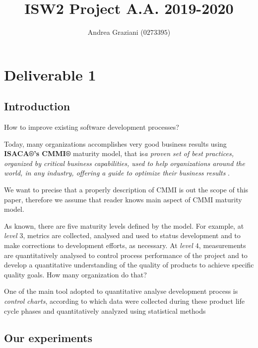 \documentclass[sigconf]{acmart}
\begin{document}
\title{ISW2 Project A.A. 2019-2020}

\author{Andrea Graziani ($0273395$)}

\maketitle
\section{Deliverable 1}

\subsection{Introduction}

How to improve existing software development processes?

Today, many organizations accomplishes very good business results using \textbf{ISACA®’s CMMI®} maturity model, that is\textit{a proven set of best practices, organized by critical business capabilities, used to help organizations around the world, in any industry, offering a guide to optimize their business results} \cite{CMMIINSTITUTE}.

We want to precise that a properly description of CMMI is out the scope of this paper, therefore we assume that reader knows main aspect of CMMI maturity model.

As known, there are five maturity levels defined by the model. For example, at \textit{level $3$}, metrics are collected, analysed and used to status development and to make corrections to development efforts, as necessary. At \textit{level $4$}, measurements are quantitatively analysed to control process performance of the project and to develop a quantitative understanding of the quality of products to achieve specific quality goals. How many organization do that?

One of the main tool adopted to quantitative analyse development process is \textit{control charts}, according to which data were collected during these product life cycle phases and quantitatively analyzed using statistical methods

\subsection{Our experiments}
\end{document}
